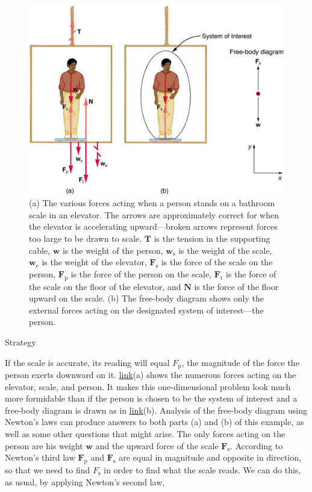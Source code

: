 \documentclass[
]{book}
\begin{document}
\begin{figure}
\hypertarget{import-auto-id347645}{%
\centering
\includegraphics{images/Figure 04_07_03.jpg}
\caption{(a) The various forces acting when a person stands on a bathroom scale
in an elevator. The arrows are approximately correct for when the
elevator is accelerating upward---broken arrows represent forces too
large to be drawn to scale. \(\textbf{T}{}\) is the tension in the
supporting cable, \(\textbf{w}{}\) is the weight of the person,
\(\textbf{w}_{\text{s}}{}\) is the weight of the scale,
\(\textbf{w}_{\text{e}}{}\) is the weight of the elevator,
\(\textbf{F}_{\text{s}}{}\) is the force of the scale on the person,
\(\textbf{F}_{\text{p}}{}\) is the force of the person on the scale,
\(\textbf{F}_{\text{t}}{}\) is the force of the scale on the floor of the
elevator, and \(\textbf{N}{}\) is the force of the floor upward on the
scale. (b) The free-body diagram shows only the external forces acting
on the designated system of interest---the
person.}\label{import-auto-id347645}
}
\end{figure}

{Strategy}

If the scale is accurate, its reading will equal \(F_{\text{p}}{}\), the
magnitude of the force the person exerts downward on it.
\protect\hyperlink{import-auto-id347645}{link}(a) shows the
numerous forces acting on the elevator, scale, and person. It makes this
one-dimensional problem look much more formidable than if the person is
chosen to be the system of interest and a free-body diagram is drawn as
in \protect\hyperlink{import-auto-id347645}{link}(b). Analysis of
the free-body diagram using Newton's laws can produce answers to both
parts (a) and (b) of this example, as well as some other questions that
might arise. The only forces acting on the person are his weight
\(\textbf{w}{}\) and the upward force of the scale
\(\textbf{F}_{\text{s}}{}\). According to Newton's third law
\(\textbf{F}_{\text{p}}{}\) and \(\textbf{F}_{\text{s}}{}\) are equal in
magnitude and opposite in direction, so that we need to find
\(F_{\text{s}}{}\) in order to find what the scale reads. We can do this,
as usual, by applying Newton's second law,
\end{document}
